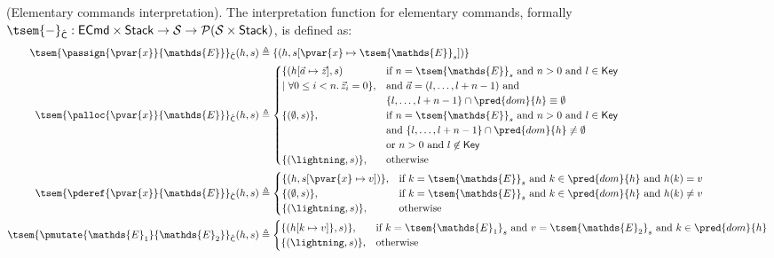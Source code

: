 
\param (Elementary commands interpretation). The interpretation function for elementary commands, formally $\tsem{-}_{\hat{\mathsf{C}}} : \mathsf{ECmd} \times \mathsf{Stack} \rightarrow \mathcal{S} \rightarrow \mathcal{P}(\mathcal{S} \times \mathsf{Stack})$, is defined as:
\begin{align*}
	\tsem{\passign{\pvar{x}}{\mathds{E}}}_{\hat{\mathsf{C}}}(h, s) &\triangleq \{ (h, s[\pvar{x} \mapsto \tsem{\mathds{E}}_s]) \}
	\\
	\tsem{\palloc{\pvar{x}}{\mathds{E}}}_{\hat{\mathsf{C}}}(h, s) &\triangleq
		\begin{cases}
			\{ (h[\vec{a} \mapsto \vec{z}], s)
			&
			\text{if } n = \tsem{\mathds{E}}_s \text{ and } n > 0 \text{ and } l \in \mathsf{Key} \\
			|\ \forall 0 \leq i < n \ldotp \vec{z}_i = 0 \}, & \text{and } \vec{a} = (l, \ldots, l + n - 1) \text{ and } \\
			& \{ l, \ldots, l + n - 1 \} \cap \pred{dom}{h} \equiv \emptyset \\
			\{(\emptyset, s)\}, & \text{if } n = \tsem{\mathds{E}}_s \text{ and } n > 0 \text{ and } l \in \mathsf{Key} \\ & \text{and } \{ l, \ldots, l + n - 1 \} \cap \pred{dom}{h} \not\equiv \emptyset \\
			& \text{or } n > 0 \text{ and } l \not\in \mathsf{Key} \\
			\{ (\lightning, s) \}, & \text{otherwise}
		\end{cases}
	\\
	\tsem{\pderef{\pvar{x}}{\mathds{E}}}_{\hat{\mathsf{C}}}(h, s) &\triangleq
		\begin{cases}
			\{ (h, s[\pvar{x} \mapsto v]) \}, & \text{if } k = \tsem{\mathds{E}}_s \text{ and } k \in \pred{dom}{h} \text{ and } h(k) = v \\
			\{ (\emptyset, s) \}, & \text{if } k = \tsem{\mathds{E}}_s \text{ and } k \in \pred{dom}{h} \text{ and } h(k) \neq v \\
			\{ (\lightning, s) \}, & \text{otherwise}
		\end{cases}
	\\
	\tsem{\pmutate{\mathds{E}_1}{\mathds{E}_2}}_{\hat{\mathsf{C}}}(h, s) &\triangleq
	\begin{cases}
		\{ (h[k \mapsto v] \}, s) \}, & \text{if } k = \tsem{\mathds{E}_1}_s \text{ and } v = \tsem{\mathds{E}_2}_s \text{ and } k \in \pred{dom}{h} \\
		\{ (\lightning, s) \}, & \text{otherwise}
	\end{cases}
\end{align*}

